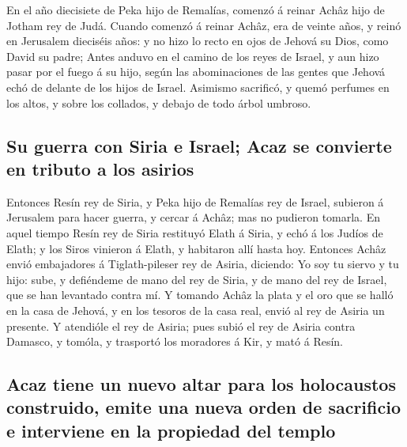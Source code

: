  En el año diecisiete de Peka hijo de Remalías, comenzó á
reinar Achâz hijo de Jotham rey de Judá.  Cuando comenzó á
reinar Achâz, era de veinte años, y reinó en Jerusalem dieciséis años: y
no hizo lo recto en ojos de Jehová su Dios, como David su padre;
 Antes anduvo en el camino de los reyes de Israel, y aun
hizo pasar por el fuego á su hijo, según las abominaciones de las gentes
que Jehová echó de delante de los hijos de Israel. 
Asimismo sacrificó, y quemó perfumes en los altos, y sobre los collados,
y debajo de todo árbol umbroso.

\hypertarget{su-guerra-con-siria-e-israel-acaz-se-convierte-en-tributo-a-los-asirios}{%
\subsection{Su guerra con Siria e Israel; Acaz se convierte en tributo a
los
asirios}\label{su-guerra-con-siria-e-israel-acaz-se-convierte-en-tributo-a-los-asirios}}

 Entonces Resín rey de Siria, y Peka hijo de Remalías rey
de Israel, subieron á Jerusalem para hacer guerra, y cercar á Achâz; mas
no pudieron tomarla.  En aquel tiempo Resín rey de Siria
restituyó Elath á Siria, y echó á los Judíos de Elath; y los Siros
vinieron á Elath, y habitaron allí hasta hoy.  Entonces
Achâz envió embajadores á Tiglath-pileser rey de Asiria, diciendo: Yo
soy tu siervo y tu hijo: sube, y defiéndeme de mano del rey de Siria, y
de mano del rey de Israel, que se han levantado contra mí.
 Y tomando Achâz la plata y el oro que se halló en la casa
de Jehová, y en los tesoros de la casa real, envió al rey de Asiria un
presente.  Y atendióle el rey de Asiria; pues subió el rey
de Asiria contra Damasco, y tomóla, y trasportó los moradores á Kir, y
mató á Resín.

\hypertarget{acaz-tiene-un-nuevo-altar-para-los-holocaustos-construido-emite-una-nueva-orden-de-sacrificio-e-interviene-en-la-propiedad-del-templo}{%
\subsection{Acaz tiene un nuevo altar para los holocaustos construido,
emite una nueva orden de sacrificio e interviene en la propiedad del
templo}\label{acaz-tiene-un-nuevo-altar-para-los-holocaustos-construido-emite-una-nueva-orden-de-sacrificio-e-interviene-en-la-propiedad-del-templo}}

